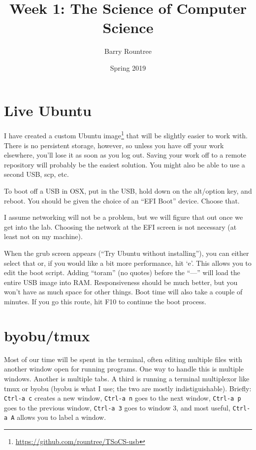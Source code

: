 \documentclass{tufte-handout}
\title{Week 1:  The Science of Computer Science}
\author{Barry Rountree}
\date{Spring 2019}
\begin{document}
\maketitle%

\section{Live Ubuntu}

I have created a custom Ubuntu image\footnote{\url{https://github.com/rountree/TSoCS-usb}} that will be slightly
easier to work with.  There is no persistent storage, however,
so unless you have off your work elsewhere, you'll lose it as
soon as you log out. Saving your work off to a remote repository will probably be the
easiest solution.  You might also be able to use a second USB, scp, etc.

To boot off a USB in OSX, put in the USB, hold down on the alt/option key, and reboot.
You should be given the choice of an ``EFI Boot'' device.  Choose that.

I assume networking will not be a problem, but we will figure that out once we get into
the lab.  Choosing the network at the EFI screen is not necessary (at least not on my machine).

When the grub screen appears (``Try Ubuntu without installing''), you can either select that or,
if you would like a bit more performance, hit `e'.  This allows you to edit the boot 
script.  Adding ``toram'' (no quotes) before the ``---'' will load the entire USB image into
RAM.  Responsiveness should be much better, but you won't have as much space for other things.
Boot time will also take a couple of minutes.  If you go this route, hit F10 to continue the
boot process.

\section{byobu/tmux}

Most of our time will be spent in the terminal, often editing multiple files with another
window open for running programs.  One way to handle this is multiple windows.  Another is 
multiple tabs.  A third is running a terminal multiplexor like tmux or byobu (byobu is what
I use; the two are mostly indistiguishable).  Briefly:  \texttt{Ctrl-a c} creates a new
window, \texttt{Ctrl-a n} goes to the next window, \texttt{Ctrl-a p} goes to the previous
window, \texttt{Ctrl-a 3} goes to window 3, and most useful, \texttt{Ctrl-a A} allows you to
label a window.  
\end{document}
